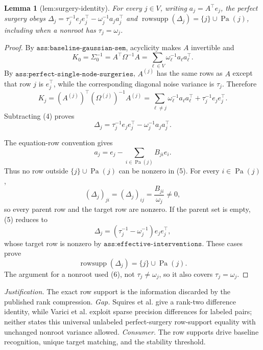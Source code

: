 \documentclass{article}
\newtheorem{lemma}{Lemma}
\begin{document}
\begin{lemma}[lem:surgery-identity]\label{lem:surgery-identity}
For every \(j\in V\), writing \(a_j=A^{\top}e_j\), the perfect surgery obeys \(\Delta_j=\tau_j^{-1}e_je_j^{\top}-\omega_j^{-1}a_ja_j^{\top}\) and \(\operatorname{rowsupp}(\Delta_j)=\{j\}\cup\operatorname{Pa}(j)\), including when a nonroot has \(\tau_j=\omega_j\).
\end{lemma}
\begin{proof}
By \(\texttt{ass:baseline-gaussian-sem}\), acyclicity makes \(A\)
invertible and
\[
 K_0=\Sigma_0^{-1}=A^{\top}\Omega^{-1}A
     =\sum_{\ell\in V}\omega_\ell^{-1}a_\ell a_\ell^{\top}.          \tag{4}
\]
By \(\texttt{ass:perfect-single-node-surgeries}\), \(A^{(j)}\) has the
same rows as \(A\) except that row \(j\) is \(e_j^{\top}\), while the
corresponding diagonal noise variance is \(\tau_j\).  Therefore
\[
 K_j=(A^{(j)})^{\top}(\Omega^{(j)})^{-1}A^{(j)}
 =\sum_{\ell\neq j}\omega_\ell^{-1}a_\ell a_\ell^{\top}
  +\tau_j^{-1}e_je_j^{\top}.
\]
Subtracting (4) proves
\[
 \Delta_j
 =\tau_j^{-1}e_je_j^{\top}
  -\omega_j^{-1}a_ja_j^{\top}.                                    \tag{5}
\]

The equation-row convention gives
\[
 a_j=e_j-\sum_{i\in\operatorname{Pa}(j)}B_{ji}e_i.
\]
Thus no row outside \(\{j\}\cup\operatorname{Pa}(j)\) can be nonzero in
(5).  For every \(i\in\operatorname{Pa}(j)\),
\[
 (\Delta_j)_{ji}=(\Delta_j)_{ij}=\frac{B_{ji}}{\omega_j}\neq0,       \tag{6}
\]
so every parent row and the target row are nonzero.  If the parent set is
empty, (5) reduces to
\[
 \Delta_j=(\tau_j^{-1}-\omega_j^{-1})e_je_j^{\top},
\]
whose target row is nonzero by
\(\texttt{ass:effective-interventions}\).  These cases prove
\[
 \operatorname{rowsupp}(\Delta_j)
 =\{j\}\cup\operatorname{Pa}(j).
\]
The argument for a nonroot used (6), not
\(\tau_j\neq\omega_j\), so it also covers \(\tau_j=\omega_j\).
\end{proof}
\par\smallskip\noindent \textit{Justification.} The exact row support is the information discarded by the published rank compression. \textit{Gap.} Squires et al. give a rank-two difference identity, while Varici et al. exploit sparse precision differences for labeled pairs; neither states this universal unlabeled perfect-surgery row-support equality with unchanged nonroot variance allowed. \textit{Consumer.} The row supports drive baseline recognition, unique target matching, and the stability threshold.
\end{document}
